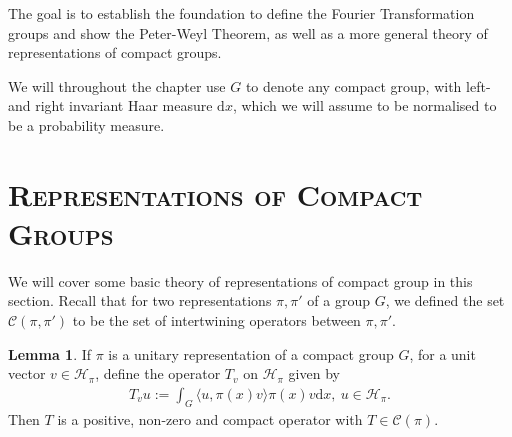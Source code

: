 \documentclass[10pt,twoside,openany,final]{memoir}
\newcommand{\sssection}[1]{%
\section[#1]{\centering\normalfont\scshape \textbf{#1}}}
\theoremstyle{definition}
\newtheorem{lemma}[theorem]{Lemma}
\theoremstyle{Break}
\renewcommand{\H}{\mathcal{H}}
\renewcommand{\d}{\mathrm{d}}
\begin{document}
The goal is to establish the foundation to define the Fourier Transformation groups and show the Peter-Weyl Theorem, as well as a more general theory of representations of compact groups.

We will throughout the chapter use $G$ to denote any compact group, with left-and right invariant Haar measure $\d x$, which we will assume to be normalised to be a probability measure.

\sssection{Representations of Compact Groups}
We will cover some basic theory of representations of compact group in this section. Recall that for two representations $\pi,\pi'$ of a group $G$, we defined the set $\mathcal{C}(\pi,\pi')$ to be the set of intertwining operators between $\pi,\pi'$.
\begin{lemma}
	If $\pi$ is a unitary representation of a compact group $G$, for a unit vector $v \in \H_\pi$, define the operator $T_v$ on $\H_\pi$ given by
	\begin{align}
		T_v u := \int_G \langle u,\pi(x)v \rangle \pi(x)v \d x, \ u \in \H_\pi. 
		\label{Tdef}
	\end{align}
	Then $T$ is a positive, non-zero and compact operator with $T \in \mathcal{C}(\pi)$.
	\label{5.1}
\end{lemma}
\end{document}
